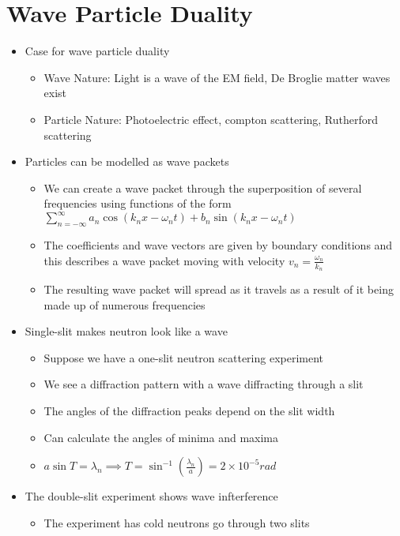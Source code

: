 \documentclass[12pt]{article}
\begin{document}
\section{Wave Particle Duality}

\begin{itemize}
    \item Case for wave particle duality \begin{itemize}
        \item Wave Nature: Light is a wave of the EM field, De Broglie matter waves exist
        \item Particle Nature: Photoelectric effect, compton scattering, Rutherford scattering
    \end{itemize}
    \item Particles can be modelled as wave packets \begin{itemize}
        \item We can create a wave packet through the superposition of several frequencies using functions of the form $\sum_{n=-\infty}^{\infty} a_n \cos(k_nx - \omega_n t) + b_n \sin(k_n x - \omega_n t)$
        \item The coefficients and wave vectors are given by boundary conditions and this describes a wave packet moving with velocity $v_n = \frac{\omega_n}{k_n}$
        \item The resulting wave packet will spread as it travels as a result of it being made up of numerous frequencies
    \end{itemize}
    \item Single-slit makes neutron look like a wave \begin{itemize}
        \item Suppose we have a one-slit neutron scattering experiment
        \item We see a diffraction pattern with a wave diffracting through a slit
        \item The angles of the diffraction peaks depend on the slit width
        \item Can calculate the angles of minima and maxima
        \item $a \sin T = \lambda_n \implies T = \sin^{-1} (\frac{\lambda_n}{a}) = 2 \times 10^{-5} rad$
    \end{itemize}
    \item The double-slit experiment shows wave infterference \begin{itemize}
        \item The experiment has cold neutrons go through two slits 

\end{itemize}
\end{itemize}
\end{document}
